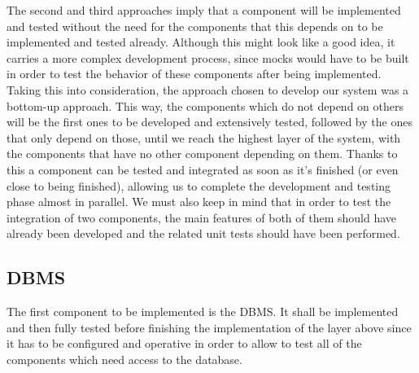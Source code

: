 \documentclass[12pt]{article}
\begin{document}
\noindent The second and third approaches imply that a component will be implemented
and tested without the need for the components that this depends on to be implemented and tested already. 
Although this might look like a good idea, it carries a
more complex development process, since mocks would have to be built in order to
test the behavior of these components after being implemented. Taking this into
consideration, the approach chosen to develop our system was a bottom-up
approach. This way, the components which do not depend on others will be the
first ones to be developed and extensively tested, followed by the ones that only depend on those, until we reach the highest layer of the system, with the components
that have no other component depending on them. Thanks to this a component can
be tested and integrated as soon as it's finished (or even close to being finished),
allowing us to complete the development and testing phase almost in parallel. We
must also keep in mind that in order to test the integration of two components, the
main features of both of them should have already been developed and the related
unit tests should have been performed.
\subsection{DBMS}
The first component to be implemented is the DBMS. It shall be implemented and then fully tested before finishing the implementation of the layer above since it has
to be configured and operative in order to allow to test all of the components which need access to the database.
\end{document}
